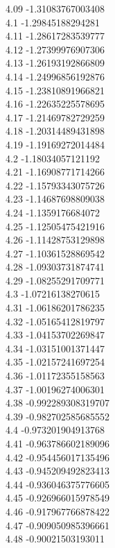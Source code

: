 {4.09	-1.31083767003408\\
4.1	-1.29845188294281\\
4.11	-1.28617283539777\\
4.12	-1.27399976907306\\
4.13	-1.26193192866809\\
4.14	-1.24996856192876\\
4.15	-1.23810891966821\\
4.16	-1.22635225578695\\
4.17	-1.21469782729259\\
4.18	-1.20314489431898\\
4.19	-1.19169272014484\\
4.2	-1.18034057121192\\
4.21	-1.16908771714266\\
4.22	-1.15793343075726\\
4.23	-1.14687698809038\\
4.24	-1.1359176684072\\
4.25	-1.12505475421916\\
4.26	-1.11428753129898\\
4.27	-1.10361528869542\\
4.28	-1.09303731874741\\
4.29	-1.08255291709771\\
4.3	-1.07216138270615\\
4.31	-1.06186201786235\\
4.32	-1.05165412819797\\
4.33	-1.04153702269847\\
4.34	-1.03151001371447\\
4.35	-1.02157241697254\\
4.36	-1.01172355158563\\
4.37	-1.00196274006301\\
4.38	-0.992289308319707\\
4.39	-0.982702585685552\\
4.4	-0.973201904913768\\
4.41	-0.963786602189096\\
4.42	-0.954456017135496\\
4.43	-0.945209492823413\\
4.44	-0.936046375776605\\
4.45	-0.926966015978549\\
4.46	-0.917967766878422\\
4.47	-0.909050985396661\\
4.48	-0.90021503193011\\
}
